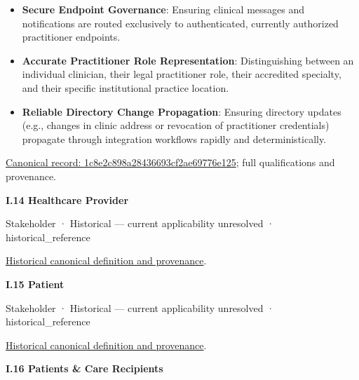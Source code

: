 \begin{itemize}


\item \textbf{Secure Endpoint Governance}: Ensuring clinical messages and notifications are routed exclusively to authenticated, currently authorized practitioner endpoints.

\item \textbf{Accurate Practitioner Role Representation}: Distinguishing between an individual clinician, their legal practitioner role, their accredited specialty, and their specific institutional practice location.

\item \textbf{Reliable Directory Change Propagation}: Ensuring directory updates (e.g., changes in clinic address or revocation of practitioner credentials) propagate through integration workflows rapidly and deterministically.

\end{itemize}

{\footnotesize \href{../../../../continuum/motivation/stakeholder/1c8e2c898a28436693cf2ae69776e125.md}{Canonical record: 1c8e2c898a28436693cf2ae69776e125}; full qualifications and provenance.}\par
\par\medskip{}\label{navigation:I.14}
\textbf{I.14 Healthcare Provider}\par

\label{element:2018200a493d458096b72031cc2ae779}
{\small Stakeholder · Historical — current applicability unresolved · historical\_reference}\par
\href{../../../../continuum/motivation/stakeholder/2018200a493d458096b72031cc2ae779.md}{Historical canonical definition and provenance}.\par
\par\medskip{}\label{navigation:I.15}
\textbf{I.15 Patient}\par

\label{element:5f6d333e94634420b8a8bbf8b9cb6e2a}
{\small Stakeholder · Historical — current applicability unresolved · historical\_reference}\par
\href{../../../../continuum/motivation/stakeholder/5f6d333e94634420b8a8bbf8b9cb6e2a.md}{Historical canonical definition and provenance}.\par
\par\medskip{}\label{navigation:I.16}
\textbf{I.16 Patients \& Care Recipients}\par

